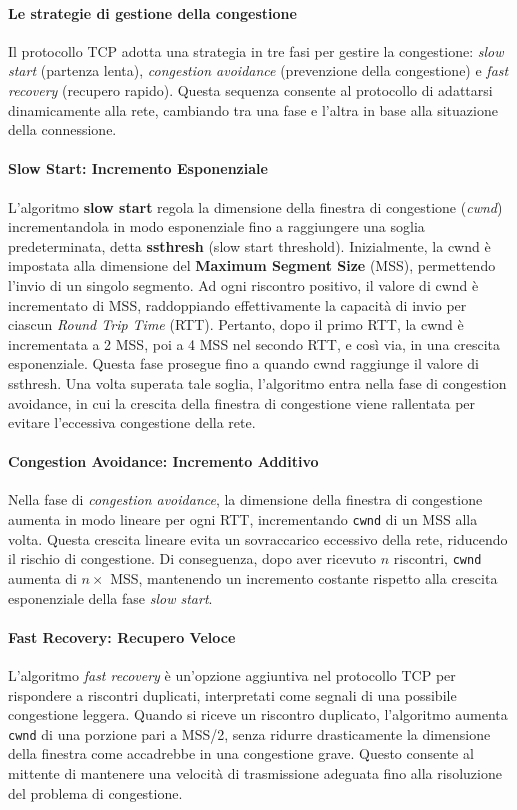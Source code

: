 \documentclass[12pt]{report}
\begin{document}
	\paragraph{Le strategie di gestione della congestione}
	Il protocollo TCP adotta una strategia in tre fasi per gestire la congestione: \textit{slow start} (partenza lenta), \textit{congestion avoidance} (prevenzione della congestione) e \textit{fast recovery} (recupero rapido). Questa sequenza consente al protocollo di adattarsi dinamicamente alla rete, cambiando tra una fase e l'altra in base alla situazione della connessione.	

	\paragraph{Slow Start: Incremento Esponenziale}
	L'algoritmo \textbf{slow start} regola la dimensione della finestra di congestione (\textit{cwnd}) incrementandola in modo esponenziale fino a raggiungere una soglia predeterminata, detta \textbf{ssthresh} (slow start threshold). Inizialmente, la cwnd è impostata alla dimensione del \textbf{Maximum Segment Size} (MSS), permettendo l'invio di un singolo segmento. Ad ogni riscontro positivo, il valore di cwnd è incrementato di MSS, raddoppiando effettivamente la capacità di invio per ciascun \textit{Round Trip Time} (RTT). Pertanto, dopo il primo RTT, la cwnd è incrementata a 2 MSS, poi a 4 MSS nel secondo RTT, e così via, in una crescita esponenziale.
	Questa fase prosegue fino a quando cwnd raggiunge il valore di ssthresh. Una volta superata tale soglia, l’algoritmo entra nella fase di congestion avoidance, in cui la crescita della finestra di congestione viene rallentata per evitare l’eccessiva congestione della rete.

	\paragraph{Congestion Avoidance: Incremento Additivo}
	Nella fase di \emph{congestion avoidance}, la dimensione della finestra di congestione aumenta in modo lineare per ogni RTT, incrementando \texttt{cwnd} di un MSS alla volta. Questa crescita lineare evita un sovraccarico eccessivo della rete, riducendo il rischio di congestione. Di conseguenza, dopo aver ricevuto $n$ riscontri, \texttt{cwnd} aumenta di $n \times$ MSS, mantenendo un incremento costante rispetto alla crescita esponenziale della fase \emph{slow start}.

	\paragraph{Fast Recovery: Recupero Veloce}
	L'algoritmo \emph{fast recovery} è un'opzione aggiuntiva nel protocollo TCP per rispondere a riscontri duplicati, interpretati come segnali di una possibile congestione leggera. Quando si riceve un riscontro duplicato, l'algoritmo aumenta \texttt{cwnd} di una porzione pari a MSS/2, senza ridurre drasticamente la dimensione della finestra come accadrebbe in una congestione grave. Questo consente al mittente di mantenere una velocità di trasmissione adeguata fino alla risoluzione del problema di congestione. 
	
\end{document}
